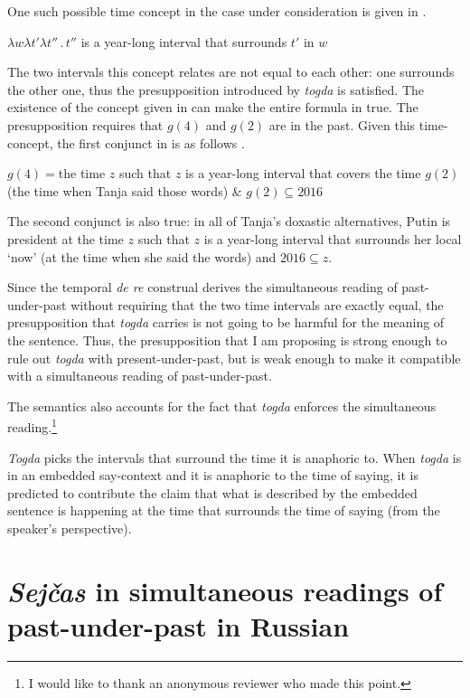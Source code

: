 \documentclass[output=paper,
modfonts,
newtxmath,
hidelinks
]{langscibook}
\begin{document}
One such possible time concept in the case under consideration is given in .

\ea $\lambda w\lambda t'\lambda t''\,.\,t''$ is a year-long interval that surrounds $t'$ in $w$\label{ex41}
\z

\noindent The two intervals this concept relates are not equal to each other: one surrounds the other one, thus the presupposition introduced by \textit{togda} is satisfied. The existence of the concept given in  can make the entire formula in  true. The presupposition requires that $g(4)$ and $g(2)$ are in the past. Given this time-concept, the first conjunct in  is as follows .

\ea $g(4)={}$the time $z$ such that $z$ is a year-long interval that covers
\glt \hspace{0.5cm}the time $g(2)$ (the time when Tanja said those words) \& $g(2)\subseteq 2016$\label{ex42}
\z

\noindent The second conjunct is also true: in all of Tanja’s doxastic alternatives, Putin is president at the time $z$ such that $z$ is a year-long interval that surrounds her local `now' (at the time when she said the words) and $2016\subseteq z$.

Since the temporal \textit{de re} construal derives the simultaneous reading of past-under-past without requiring that the two time intervals are exactly equal, the presupposition that \textit{togda} carries is not going to be harmful for the meaning of the sentence. Thus, the presupposition that I am proposing is strong enough to rule out \textit{togda} with present-under-past, but is weak enough to make it compatible with a simultaneous reading of past-under-past.

The semantics  also accounts for the fact that \textit{togda} enforces the simultaneous reading.\footnote{\label{fn12}I would like to thank an anonymous reviewer who made this point.}

\textit{Togda} picks the intervals that surround the time it is anaphoric to. When \textit{togda} is in an embedded say-context and it is anaphoric to the time of saying, it is predicted to contribute the claim that what is described by the embedded sentence is happening at the time that surrounds the time of saying (from the speaker’s perspective).

\section{\textit{Sejčas} in simultaneous readings of past-under-past in Russian}\label{s3}
\end{document}
